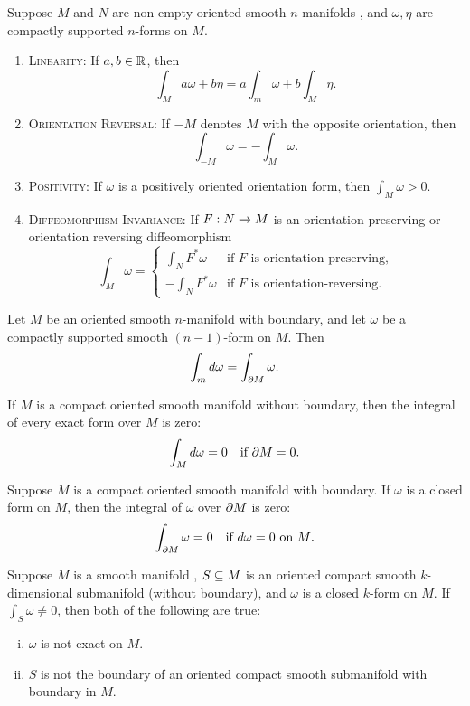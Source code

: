 \begin{prop}
Suppose $M$ and $N$ are non-empty oriented smooth $n$-manifolds \wowob, and $\omega, \eta$ are compactly supported $n$-forms on $M$.
\begin{enumerate}
    \item {\scshape Linearity:} If $a,b\in \mathbb{R}$, then
    \[\int_M a\omega + b\eta = a\int_m\omega + b\int_M \eta.\]
    \item {\scshape Orientation Reversal:} If $-M$ denotes $M$ with the opposite orientation, then
    \[\int_{-M}\omega = -\int_M\omega.\]
    \item {\scshape Positivity:} If $\omega$ is a positively oriented orientation form, then $\int_M\omega > 0$.
    \item {\scshape Diffeomorphism Invariance:} If $F:N\rightarrow M$ is an orientation-preserving or orientation reversing diffeomorphism
    \[\int_M\omega = \begin{cases} \int_N F^*\omega & \text{if $F$ is orientation-preserving,}\\ -\int_N F^*\omega & \text{if $F$ is orientation-reversing.}\end{cases}\]
\end{enumerate}
\end{prop}


\setcounter{thm}{10}

\begin{thm}
Let $M$ be an oriented smooth $n$-manifold with boundary, and let $\omega$ be a compactly supported smooth $(n - 1)$-form on $M$. Then
\[\int_m d\omega = \int_{\partial M}\omega.\]
\end{thm}

\setcounter{thm}{12}

\begin{cor}
If $M$ is a compact oriented smooth manifold without boundary, then the integral of every exact form over $M$ is zero:
\[\int_M d\omega = 0 \quad \text{if $\partial M = 0$}.\]
\end{cor}

\begin{cor}
Suppose $M$ is a compact oriented smooth manifold with boundary. If $\omega$ is a closed form on $M$, then the integral of $\omega$ over $\partial M$ is zero:
\[\int_{\partial M} \omega = 0\quad\text{if $d\omega = 0$ on $M$}.\]
\end{cor}

\begin{cor}
Suppose $M$ is a smooth manifold \wowob, $S\subseteq M$ is an oriented compact smooth $k$-dimensional submanifold (without boundary), and $\omega$ is a closed $k$-form on $M$. If $\int_S\omega \neq 0$, then both of the following are true:
\begin{enumerate}[(i)]
    \item $\omega$ is not exact on $M$.
    \item $S$ is not the boundary of an oriented compact smooth submanifold with boundary in $M$.
\end{enumerate}
\end{cor}

